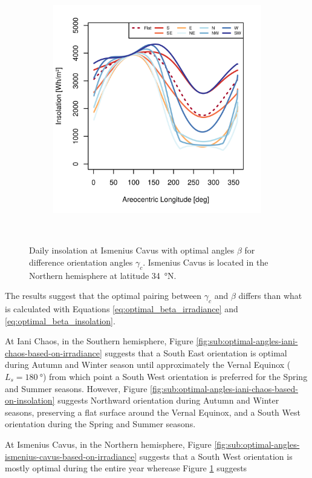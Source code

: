 \begin{figure}[h]
\begin{subfigure}[t]{\subfigureWidth}
            \includegraphics[height=\graphicsHeight]{sections/appendix/optimal-angles/plots/ismenius-cavus-tau-04-and-beta-optimal-based-on-solar-insolation.png}
            \label{fig:sub:optimal-angles-ismenius-cavus-based-on-insolation}
    \end{subfigure}\\[0.8ex]
    \caption[Daily insolation at Ismenius Cavus with optimal angles $\beta$ for difference orientation angles $\gamma_c$]
    {Daily insolation at Ismenius Cavus with optimal angles $\beta$ for difference orientation angles $\gamma_c$. Ismenius Cavus is located in the Northern hemisphere at latitude \SI{34}{\degree}N.}
    \label{fig:plot:optimal-angles-ismenius-cavus}
\vspace{-2ex}
\end{figure}

The results suggest that the optimal pairing between $\gamma_{c}$ and $\beta$ differs than what is calculated with Equations \ref{eq:optimal_beta_irradiance} and \ref{eq:optimal_beta_insolation}.

At Iani Chaos, in the Southern hemisphere, Figure \ref{fig:sub:optimal-angles-iani-chaos-based-on-irradiance} suggests that a South East orientation is optimal during Autumn and Winter season until approximately the Vernal Equinox ($L_{s} = \SI{180}{\degree}$) from which point a South West orientation is preferred for the Spring and Summer seasons. However, Figure \ref{fig:sub:optimal-angles-iani-chaos-based-on-insolation} suggests Northward orientation during Autumn and Winter seasons, preserving a flat surface around the Vernal Equinox, and a South West orientation during the Spring and Summer seasons.

At Ismenius Cavus, in the Northern hemisphere, Figure \ref{fig:sub:optimal-angles-ismenius-cavus-based-on-irradiance} suggests that a South West orientation is mostly optimal during the entire year wherease Figure \ref{fig:sub:optimal-angles-ismenius-cavus-based-on-insolation} suggests
